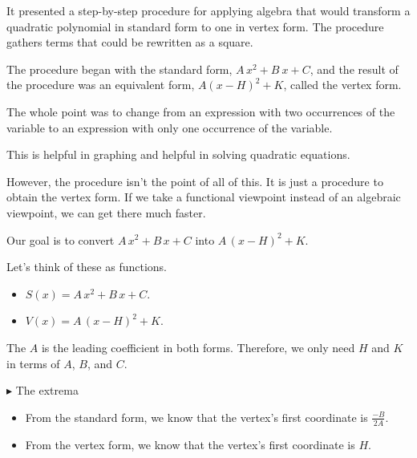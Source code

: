\documentclass{ximera}
\begin{document}
It presented a step-by-step procedure for applying algebra that would transform a quadratic polynomial in standard form to one in vertex form.  The procedure gathers terms that could be rewritten as a square.  

The procedure began with the standard form, $A \, x^2 + B \ x + C$, and the result of the procedure was an equivalent form, $A (x - H)^2 + K$, called the vertex form. 










The whole point was to change from an expression with two occurrences of the variable to an expression with only one occurrence of the variable.

This is helpful in graphing and helpful in solving quadratic equations.


However, the procedure isn't the point of all of this.  It is just a procedure to obtain the vertex form.  If we take a functional viewpoint instead of an algebraic viewpoint, we can get there much faster.










Our goal is to convert $A \, x^2 + B \, x + C$ into $A \, (x - H)^2 + K$. 

Let's think of these as functions.


\begin{itemize}
\item $S(x) = A \, x^2 + B \, x + C$.
\item $V(x) = A \, (x - H)^2 + K$.
\end{itemize}



The $A$ is the leading coefficient in both forms.  Therefore, we only need $H$ and $K$ in terms of $A$, $B$, and $C$. 




\textbf{\textcolor{blue!55!black}{$\blacktriangleright$}}  The extrema 



\begin{itemize}
\item From the standard form, we know that the vertex's first coordinate is $\frac{-B}{2 A}$.
\item From the vertex form, we know that the vertex's first coordinate is $H$.
\end{itemize}
\end{document}
